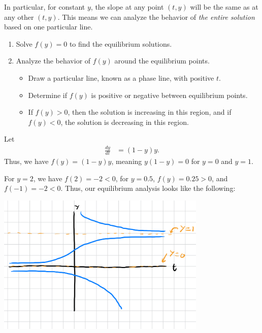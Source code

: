 \documentclass[10pt]{mypackage}
\begin{document}
In particular, for constant $y$, the slope at any point $(t,y)$ will be the same as at any other $(t,y)$. This means we can analyze the behavior of \textit{the entire solution} based on one particular line.
\begin{method}\hfill
  \begin{enumerate}[(1)]
    \item Solve $f(y) = 0$ to find the equilibrium solutions.
    \item Analyze the behavior of $f(y)$ around the equilibrium points.
      \begin{itemize}
        \item Draw a particular line, known as a phase line, with positive $t$.
        \item Determine if $f(y)$ is positive or negative between equilibrium points.
        \item If $f(y) > 0$, then the solution is increasing in this region, and if $f(y) < 0$, the solution is decreasing in this region.
      \end{itemize}
  \end{enumerate}
\end{method}
\begin{example}
  Let
  \begin{align*}
    \frac{dy}{dt} &= (1-y)y.
  \end{align*}
  Thus, we have $f(y) = (1-y)y$, meaning $y(1-y) = 0$ for $y=0$ and $y=1$.\newline

  For $ y = 2$, we have $f(2) = -2 < 0$, for $y = 0.5$, $f(y) = 0.25 > 0$, and $f(-1) = -2 < 0$. Thus, our equilibrium analysis looks like the following:
  \begin{center}
  \end{center}
  \begin{center}
    \includegraphics[width=10cm]{images/equilibrium_analysis.png}
  \end{center}
\end{example}
\end{document}
